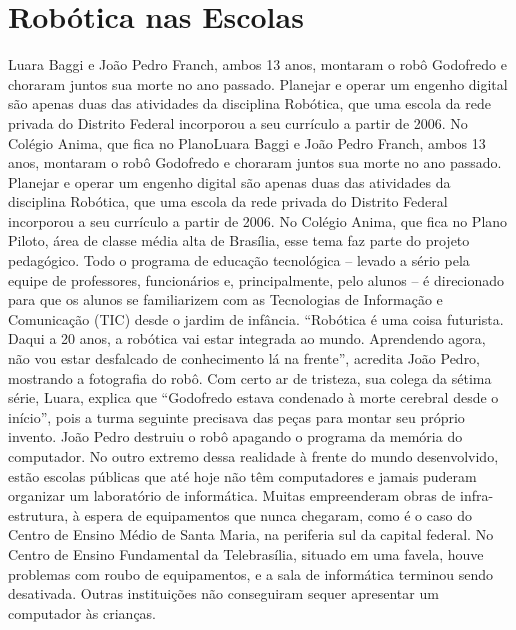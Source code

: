 \documentclass[a4paper,12pt]{report}
\begin{document}
        \section{Robótica nas Escolas}
        Luara Baggi e João Pedro Franch, ambos 13 anos, montaram o robô
        Godofredo e choraram juntos sua morte no ano passado. Planejar e operar
        um engenho digital são apenas duas das atividades da disciplina
        Robótica, que uma escola da rede privada do Distrito Federal incorporou
        a seu currículo a partir de 2006. No Colégio Anima, que fica no
        PlanoLuara Baggi e João Pedro Franch, ambos 13 anos, montaram o robô
        Godofredo e choraram juntos sua morte no ano passado. Planejar e operar
        um engenho digital são apenas duas das atividades da disciplina
        Robótica, que uma escola da rede privada do Distrito Federal incorporou
        a seu currículo a partir de 2006. No Colégio Anima, que fica no Plano
        Piloto, área de classe média alta de Brasília, esse tema faz parte do
        projeto pedagógico. Todo o programa de educação tecnológica – levado a
        sério pela equipe de professores, funcionários e, principalmente, pelo
        alunos – é direcionado para que os alunos se familiarizem com as
        Tecnologias de Informação e Comunicação (TIC) desde o jardim de
        infância. “Robótica é uma coisa futurista. Daqui a 20 anos, a robótica
        vai estar integrada ao mundo. Aprendendo agora, não vou estar desfalcado
        de conhecimento lá na frente”, acredita João Pedro, mostrando a
        fotografia do robô. Com certo ar de tristeza, sua colega da sétima
        série, Luara, explica que “Godofredo estava condenado à morte cerebral
        desde o início”, pois a turma seguinte precisava das peças para montar
        seu próprio invento. João Pedro destruiu o robô apagando o programa da
        memória do computador. No outro extremo dessa realidade à frente do
        mundo desenvolvido, estão escolas públicas que até hoje não têm
        computadores e jamais puderam organizar um laboratório de informática.
        Muitas empreenderam obras de infra-estrutura, à espera de equipamentos
        que nunca chegaram, como é o caso do Centro de Ensino Médio de Santa
        Maria, na periferia sul da capital federal. No Centro de Ensino
        Fundamental da Telebrasília, situado em uma favela, houve problemas com
        roubo de equipamentos, e a sala de informática terminou sendo
        desativada. Outras instituições não conseguiram sequer apresentar um
        computador às crianças.
\end{document}

